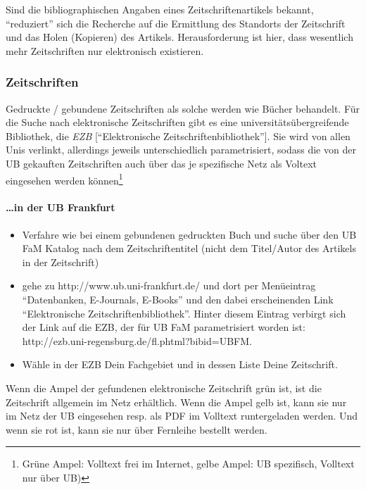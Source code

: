 \documentclass[DIV=calc,BCOR=5mm,11pt,headings=small,oneside,abstract=false, toc=bib]{scrartcl}
\begin{document}
Sind die bibliographischen Angaben eines Zeitschriftenartikels bekannt,
\enquote{reduziert} sich die Recherche auf die Ermittlung des Standorts der
Zeitschrift und das Holen (Kopieren) des Artikels. Herausforderung ist hier,
dass wesentlich mehr Zeitschriften nur elektronisch existieren.

\subsubsection{Zeitschriften}

Gedruckte / gebundene Zeitschriften als solche werden wie Bücher behandelt. Für
die Suche nach elektronische Zeitschriften gibt es eine
universitätsübergreifende Bibliothek, die \emph{EZB} [\enquote{Elektronische
Zeitschriftenbibliothek}]. Sie wird von allen Unis verlinkt, allerdings
jeweils unterschiedlich parametrisiert, sodass die von der UB gekauften
Zeitschriften auch über das je spezifische Netz als Voltext eingesehen werden
können\footnote{Grüne Ampel: Volltext frei im Internet, gelbe Ampel: UB
spezifisch, Volltext nur über UB)}
\paragraph{\ldots in der UB Frankfurt}
\begin{itemize}
  \item Verfahre wie bei einem gebundenen gedruckten Buch und suche über den UB
  FaM Katalog nach dem Zeitschriftentitel (nicht dem Titel/Autor des Artikels
  in der Zeitschrift)
  \item  gehe zu {\ttfamily http://www.ub.uni-frankfurt.de/} und dort per
  Menüeintrag \enquote{Datenbanken, E-Journals, E-Books} und den dabei
  erscheinenden Link \enquote{Elektronische Zeitschriftenbibliothek}. Hinter
  diesem Eintrag verbirgt sich der Link auf die EZB, der für UB FaM
  parametrisiert worden ist: {\ttfamily
  http://ezb.uni-regensburg.de/fl.phtml?bibid=UBFM}.
  \item Wähle in der EZB Dein Fachgebiet und in dessen Liste Deine
  Zeitschrift.
\end{itemize}

Wenn die Ampel der gefundenen elektronische Zeitschrift grün ist, ist die
Zeitschrift allgemein im Netz erhältlich. Wenn die Ampel gelb ist, kann sie nur
im Netz der UB eingesehen resp. als PDF im Volltext runtergeladen werden. Und
wenn sie rot ist, kann sie nur über Fernleihe bestellt werden.
  
\end{document}
